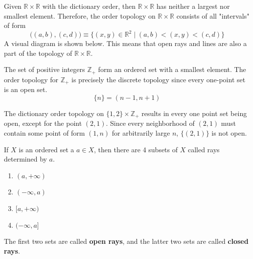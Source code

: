     \begin{example}
      Given $\mathbb{R} \times \mathbb{R}$ with the dictionary order, then $\mathbb{R} \times \mathbb{R}$ has neither a largest nor smallest element. Therefore, the order topology on $\mathbb{R} \times \mathbb{R}$ consists of all "intervals" of form
      \[\big((a, b), (c, d) \big) \equiv  \{(x, y) \in \mathbb{R}^2 \; | \; (a, b) < (x, y) < (c, d)\}\]
      A visual diagram is shown below. This means that open rays and lines are also a part of the topology of $\mathbb{R} \times \mathbb{R}$. 

      \begin{center}
      \end{center}
    \end{example}

    \begin{example}
      The set of positive integers $\mathbb{Z}_+$ form an ordered set with a smallest element. The order topology for $\mathbb{Z}_+$ is precisely the discrete topology since every one-point set is an open set. 
      \[\{n\} = (n-1, n+1)\]
    \end{example}

    \begin{example}
      The dictionary order topology on $\{1, 2\} \times \mathbb{Z}_+$ results in every one point set being open, except for the point $(2, 1)$. Since every neighborhood of $(2,1)$ must contain some point of form $(1, n)$ for arbitrarily large $n$, $\{(2,1)\}$ is not open. 
    \end{example}

    \begin{definition}
      If $X$ is an ordered set a $a \in X$, then there are 4 subsets of $X$ called rays determined by $a$. 
      \begin{enumerate}
        \item $(a, +\infty)$ 
        \item $(-\infty, a)$
        \item $[a, +\infty)$
        \item $(-\infty, a]$
      \end{enumerate}
      The first two sets are called \textbf{open rays}, and the latter two sets are called \textbf{closed rays}. 
    \end{definition}

